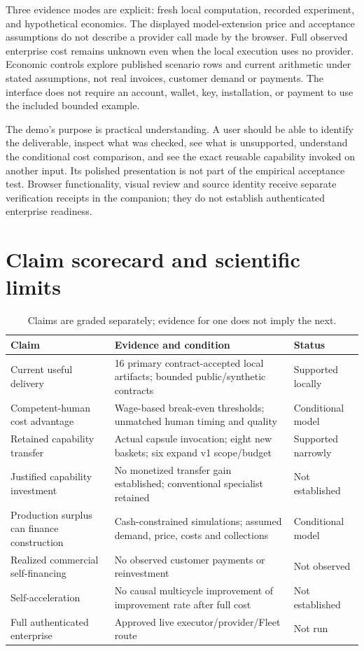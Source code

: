 Three evidence modes are explicit: fresh local computation, recorded experiment, and hypothetical economics. The displayed model-extension price and acceptance assumptions do not describe a provider call made by the browser. Full observed enterprise cost remains unknown even when the local execution uses no provider. Economic controls explore published scenario rows and current arithmetic under stated assumptions, not real invoices, customer demand or payments. The interface does not require an account, wallet, key, installation, or payment to use the included bounded example.

The demo's purpose is practical understanding. A user should be able to identify the deliverable, inspect what was checked, see what is unsupported, understand the conditional cost comparison, and see the exact reusable capability invoked on another input. Its polished presentation is not part of the empirical acceptance test. Browser functionality, visual review and source identity receive separate verification receipts in the companion; they do not establish authenticated enterprise readiness.

\section{Claim scorecard and scientific limits}

\begin{table}[htbp]\centering\small
\caption{Claims are graded separately; evidence for one does not imply the next.}\label{tab:scorecard}
\begin{tabularx}{\linewidth}{@{}lXl@{}}\toprule
Claim & Evidence and condition & Status\\\midrule
Current useful delivery & 16 primary contract-accepted local artifacts; bounded public/synthetic contracts & Supported locally\\
Competent-human cost advantage & Wage-based break-even thresholds; unmatched human timing and quality & Conditional model\\
Retained capability transfer & Actual capsule invocation; eight new baskets; six expand v1 scope/budget & Supported narrowly\\
Justified capability investment & No monetized transfer gain established; conventional specialist retained & Not established\\
Production surplus can finance construction & Cash-constrained simulations; assumed demand, price, costs and collections & Conditional model\\
Realized commercial self-financing & No observed customer payments or reinvestment & Not observed\\
Self-acceleration & No causal multicycle improvement of improvement rate after full cost & Not established\\
Full authenticated enterprise & Approved live executor/provider/Fleet route & Not run\\\bottomrule
\end{tabularx}
\end{table}

